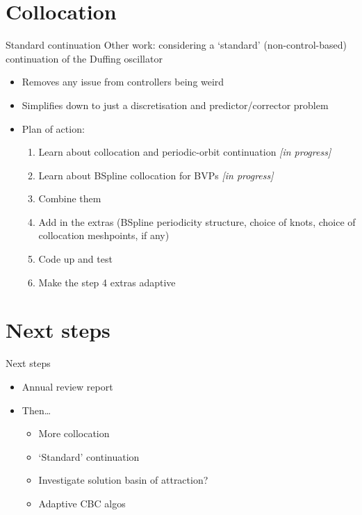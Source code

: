 \documentclass[presentation]{beamer}
\begin{document}
\section{Collocation}
\label{sec:org7b0cb54}
\begin{frame}[label={sec:orgbb6050d}]{Standard continuation}
Other work: considering a `standard' (non-control-based) continuation of the Duffing oscillator
\vfill
\begin{itemize}
\item Removes any issue from controllers being weird
\item Simplifies down to just a discretisation and predictor/corrector problem
\end{itemize}
\vfill
\begin{itemize}
\item Plan of action:
\begin{enumerate}
\item Learn about collocation and periodic-orbit continuation \alert{\emph{[in progress]}}
\item Learn about BSpline collocation for BVPs \alert{\emph{[in progress]}}
\item Combine them
\item Add in the extras (BSpline periodicity structure, choice of knots, choice of collocation meshpoints, if any)
\item Code up and test
\item Make the step 4 extras adaptive
\end{enumerate}
\end{itemize}
\end{frame}

\section{Next steps}
\label{sec:org6338b8c}
\begin{frame}[label={sec:orgba86097}]{Next steps}
\begin{itemize}
\item Annual review report
\end{itemize}
\vfill
\begin{itemize}
\item Then\ldots{}
\begin{itemize}
\item More collocation
\item `Standard' continuation
\item Investigate solution basin of attraction?
\item Adaptive CBC algos
\end{itemize}
\end{itemize}
\end{frame}
\end{document}
